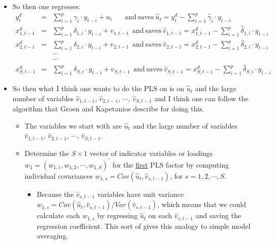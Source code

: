 \documentclass[11pt]{article}
\begin{document}
\begin{itemize}
\begin{itemize}
\end{itemize}
\item So then one regresses:
\begin{eqnarray}
y^{d}_{t}&=&\sum_{i=1}^{p}\gamma_{i}\cdot y_{t-i}+u_{t} \ \ \ \  \ \ \ \ \textrm{and} \  \textrm{saves} \  
\widehat{u}_{t}=y^{d}_{t}-\sum_{i=1}^{p}\widehat{\gamma}_{i}\cdot y_{t-i} \nonumber \\
x^{d}_{1,t-1}&=&\sum_{i=1}^{p}\delta_{1,i}\cdot y_{t-i}+v_{1,t-1} \ \ \textrm{and} \  \textrm{saves} \  
\widehat{v}_{1,t-1}=x^{d}_{1,t-1}-\sum_{i=1}^{p}\widehat{\delta}_{1,i}\cdot y_{t-i}  \nonumber \\
x^{d}_{2,t-1}&=&\sum_{i=1}^{p}\delta_{2,i}\cdot y_{t-i}+v_{2,t-1} \ \ \textrm{and} \  \textrm{saves} \  
\widehat{v}_{2,t-1}=x^{d}_{2,t-1}-\sum_{i=1}^{p}\widehat{\delta}_{2,i}\cdot y_{t-i}  \nonumber \\
&&\cdots  \nonumber \\
&&\cdots  \nonumber \\
x^{d}_{S,t-1}&=&\sum_{i=1}^{p}\delta_{S,i}\cdot y_{t-i}+v_{S,t-1} \ \ \textrm{and} \  \textrm{saves} \  
\widehat{v}_{S,t-1}=x^{d}_{S,t-1}-\sum_{i=1}^{p}\widehat{\delta}_{S,i}\cdot y_{t-i} \nonumber 
\end{eqnarray}
\item So then what I think one wants to do the PLS on is on $\widehat{u}_{t}$ and the large number of variables $\widehat{v}_{1,t-1}$, $\widehat{v}_{2,t-1}$, $\cdots$, $\widehat{v}_{S,t-1}$ and I think one can follow the algorithm that Groen and Kapetanios describe for doing this.
\begin{itemize}
\item The variables we start with are $\widehat{u}_{t}$ and the large number of variables $\widehat{v}_{1,t-1}$, $\widehat{v}_{2,t-1}$, $\cdots$, $\widehat{v}_{S,t-1}$.
\item Determine the $S\times1$ vector of indicator variables or loadings $w_{\mathsf{1}}=\left(w_{\mathsf{1},1}, w_{\mathsf{1},2},\cdots,w_{\mathsf{1},S}\right)^{\prime}$ for the \underline{first} PLS factor by computing individual covariances $w_{\mathsf{1},s}=Cov(\widehat{u}_{t},\widehat{v}_{s,t-1})$, for $s=1,2,\cdots,S$. 
\begin{itemize}
\item Because the $\widehat{v}_{s,t-1}$ variables have unit variance $w_{\mathsf{1},s}=Cov(\widehat{u}_{t},\widehat{v}_{s,t-1})/Var(\widehat{v}_{s,t-1})$, which means that we could calculate each $w_{\mathsf{1},s}$ by regressing $\widehat{u}_{t}$ on each $\widehat{v}_{s,t-1}$ and saving the regression coefficient.  This sort of gives this analogy to simple model averaging.

\end{itemize}
\end{itemize}
\end{itemize}
\end{document}
